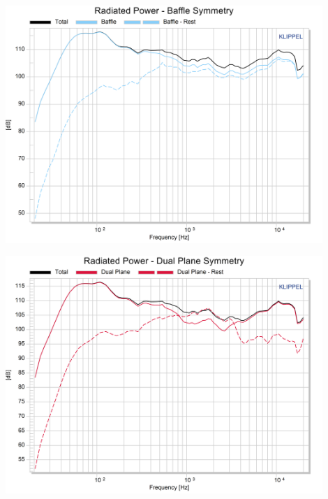 \documentclass{report}
\begin{document}
\begin{appendices}
\begin{minipage}{0.5\textwidth}
\begin{center}
	\includegraphics[width=0.9\textwidth]{Sym/BnO_RadPow_B}
    \captionsetup{hypcap=false}
\end{center}
\end{minipage}
\begin{minipage}{0.5\textwidth}
\begin{center}
	\includegraphics[width=0.9\textwidth]{Sym/BnO_RadPow_Dps}
    \captionsetup{hypcap=false}
\end{center}
\end{minipage}


\end{appendices}
\end{document}
